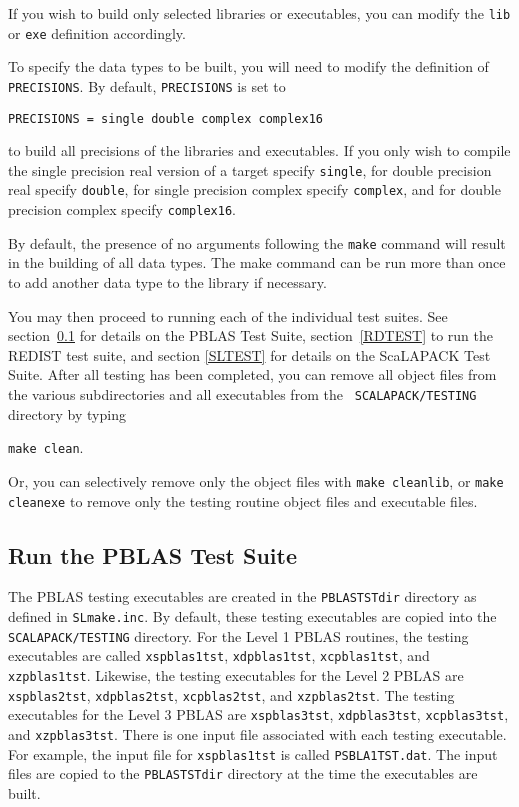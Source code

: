 \documentclass[11pt]{report}
\begin{document}
If you wish to build only selected libraries or executables,
you can modify the {\tt lib} or {\tt exe} definition accordingly.

To specify the data types to be built, you will need to modify
the definition of {\tt PRECISIONS}.  By default, {\tt PRECISIONS}
is set to
\begin{verbatim}
PRECISIONS = single double complex complex16
\end{verbatim}
to build all precisions of the libraries and executables.  If you only
wish to compile the single precision real version of a target specify
{\tt single}, for double precision real specify {\tt double}, for single
precision complex specify {\tt complex}, and for double precision
complex specify {\tt complex16}.

By default, the presence of
no arguments following the {\tt make} command will result in the
building of all data types.
The make command can be run more than once to add another
data type to the library if necessary.

You may then proceed to running each of the individual test suites.  See
section~\ref{PBTEST} for details on the PBLAS Test Suite,
section~\ref{RDTEST} to run the REDIST test suite, and section \ref{SLTEST}
for details on the ScaLAPACK Test Suite.  After
all testing has been completed, you can remove all object files from the
various subdirectories and all executables from the {\tt
SCALAPACK/TESTING} directory by
typing

\begin{list}{}{}
\item {\tt make clean}.
\end{list}

Or, you can selectively remove only the object files with {\tt make
cleanlib}, or {\tt make cleanexe} to remove only the testing routine
object files and executable files. 

\subsection{Run the PBLAS Test Suite}
\label{PBTEST}

The PBLAS testing executables are created in the {\tt PBLASTSTdir}
directory as defined in {\tt SLmake.inc}.  By default, these testing
executables are copied into the {\tt SCALAPACK/TESTING} directory.
 For the Level 1 PBLAS routines, the testing executables are called
{\tt xspblas1tst}, {\tt xdpblas1tst}, {\tt xcpblas1tst}, and {\tt xzpblas1tst}.
Likewise, the testing executables for the Level 2 PBLAS are {\tt xspblas2tst},
{\tt xdpblas2tst}, {\tt xcpblas2tst}, and {\tt xzpblas2tst}.  The
testing executables for the Level 3 PBLAS are {\tt xspblas3tst},
{\tt xdpblas3tst}, {\tt xcpblas3tst}, and {\tt xzpblas3tst}. There is one input
file associated with each testing executable.  For example, the input
file for {\tt xspblas1tst} is called {\tt PSBLA1TST.dat}.  The input files
are copied to the {\tt PBLASTSTdir} directory at the time the
executables are built.
\end{document}
